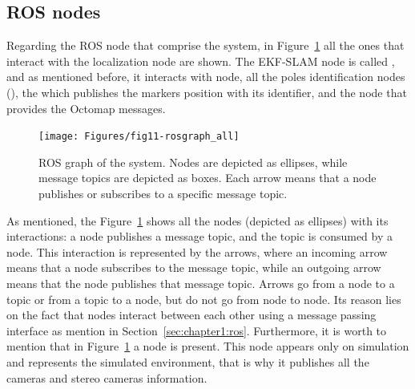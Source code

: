 \subsection{ROS nodes}
\label{subsec:chapter2:arch:nodes}
Regarding the ROS node that comprise the system, in Figure~\ref{fig:chapter2:architecture:nodes:all} all the ones that interact with the localization node are shown. The EKF-SLAM node is called , and as mentioned before, it interacts with  node, all the poles identification nodes (), the  which publishes the markers position with its identifier, and the  node that provides the Octomap messages. \\
\begin{figure}[H]
    \centering
    \texttt{[image: Figures/fig11-rosgraph\_all]}
    \caption[ROS graph of the system]{ROS graph of the system. Nodes are depicted as ellipses, while message topics are depicted as boxes. Each arrow means that a node publishes or subscribes to a specific message topic.}
    \label{fig:chapter2:architecture:nodes:all}
\end{figure}
As mentioned, the Figure~\ref{fig:chapter2:architecture:nodes:all} shows all the nodes (depicted as ellipses) with its interactions: a node publishes a message topic, and the topic is consumed by a node. This interaction is represented by the arrows, where an incoming arrow means that a node subscribes to the message topic, while an outgoing arrow means that the node publishes that message topic. Arrows go from a node to a topic or from a topic to a node, but do not go from node to node. Its reason lies on the fact that nodes interact between each other using a message passing interface as mention in Section~\ref{sec:chapter1:ros}. Furthermore, it is worth to mention that in Figure~\ref{fig:chapter2:architecture:nodes:all} a  node is present. This node appears only on simulation and represents the simulated environment, that is why it publishes all the cameras and stereo cameras information.\\
